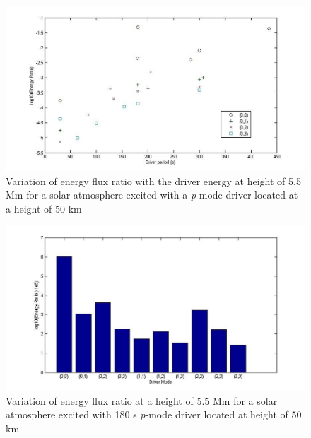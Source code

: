 \documentclass[preprint,authoryear,12pt]{elsarticle}
\begin{document}
\begin{figure}[t]
\includegraphics[scale=0.6]{imrescale/ratio_varoverdrve_eflux_vperiod_for_modes_5p5Mm.jpg}
\caption{Variation of energy flux ratio with the driver energy at height of 5.5 Mm for a solar atmosphere excited with a {\it p}-mode driver located at a height of 50 km}
\label{Fig17}
\end{figure}


\begin{figure}[t]
\includegraphics[scale=0.4]{imrescale/ratio_varoverdrve_eflux_vperiod_forallmodes_180s_5p5Mm.jpg}
\caption{Variation of energy flux ratio at a height of 5.5 Mm for a solar atmosphere excited with 180 s {\it p}-mode driver located 
at height of 50 km}
\label{Fig18}
\end{figure}
\end{document}
